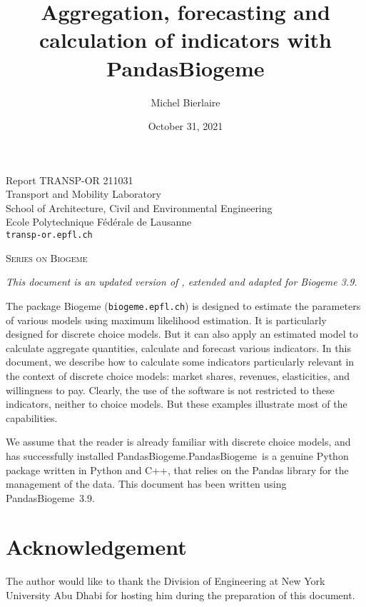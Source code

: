 \documentclass[12pt,a4paper]{article}
\title{Aggregation, forecasting and calculation of  indicators with PandasBiogeme}
\author{Michel Bierlaire}
\date{October 31, 2021}
\newcommand{\PDBIOGEME}{PandasBiogeme}
\begin{document}
\begin{titlepage}
\pagestyle{empty}

\maketitle
\vspace{2cm}

\begin{center}
\small Report TRANSP-OR 211031 \\ Transport and Mobility Laboratory \\ School of Architecture, Civil and Environmental Engineering \\ Ecole Polytechnique F\'ed\'erale de Lausanne \\ \verb+transp-or.epfl.ch+
\begin{center}
\textsc{Series on Biogeme}
\end{center}
\end{center}


\clearpage
\end{titlepage}

\emph{This document is an updated version of ,
  extended and adapted for Biogeme 3.9.}

The package Biogeme (\texttt{biogeme.epfl.ch}) is designed to estimate
the parameters of various models using maximum likelihood
estimation. It is particularly designed for discrete choice
models. But it can also apply an estimated model to calculate
aggregate quantities, calculate and forecast various indicators. In
this document, we describe how to calculate some indicators
particularly relevant in the context of discrete choice models: market
shares, revenues, elasticities, and willingness to pay. Clearly, the
use of the software is not restricted to these indicators, neither to
choice models. But these examples illustrate most of the capabilities.

We assume that the reader is already familiar with discrete choice
models, and has successfully installed \PDBIOGEME.\@  \PDBIOGEME\ is
a genuine Python package written in Python and C++, that relies on the
Pandas library for the management of the data.  This document has
been written using \PDBIOGEME\ 3.9.

\section*{Acknowledgement}
The author would like to thank the Division of Engineering at New York
University Abu Dhabi for hosting him during the preparation of this
document. 
\end{document}
